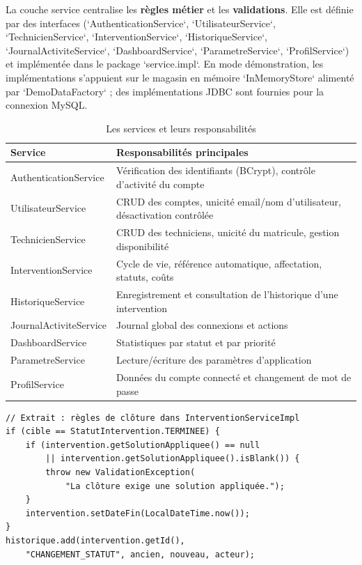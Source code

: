 \documentclass[11pt,a4paper]{report}
\begin{document}
La couche service centralise les \textbf{règles métier} et les \textbf{validations}. Elle est définie par des interfaces (`AuthenticationService`, `UtilisateurService`, `TechnicienService`, `InterventionService`, `HistoriqueService`, `JournalActiviteService`, `DashboardService`, `ParametreService`, `ProfilService`) et implémentée dans le package `service.impl`. En mode démonstration, les implémentations s'appuient sur le magasin en mémoire `InMemoryStore` alimenté par `DemoDataFactory` ; des implémentations JDBC sont fournies pour la connexion MySQL.
\begin{table}[htbp]\centering\small
\begin{tabularx}{\textwidth}{|p{3.8cm}|X|}
\hline\rowcolor{hdr}\textbf{Service} & \textbf{Responsabilités principales}\\ \hline
AuthenticationService & Vérification des identifiants (BCrypt), contrôle d'activité du compte\\ \hline
UtilisateurService & CRUD des comptes, unicité email/nom d'utilisateur, désactivation contrôlée\\ \hline
TechnicienService & CRUD des techniciens, unicité du matricule, gestion disponibilité\\ \hline
InterventionService & Cycle de vie, référence automatique, affectation, statuts, coûts\\ \hline
HistoriqueService & Enregistrement et consultation de l'historique d'une intervention\\ \hline
JournalActiviteService & Journal global des connexions et actions\\ \hline
DashboardService & Statistiques par statut et par priorité\\ \hline
ParametreService & Lecture/écriture des paramètres d'application\\ \hline
ProfilService & Données du compte connecté et changement de mot de passe\\ \hline
\end{tabularx}
\caption{Les services et leurs responsabilités}
\end{table}
\begin{lstlisting}
// Extrait : règles de clôture dans InterventionServiceImpl
if (cible == StatutIntervention.TERMINEE) {
    if (intervention.getSolutionAppliquee() == null
        || intervention.getSolutionAppliquee().isBlank()) {
        throw new ValidationException(
            "La clôture exige une solution appliquée.");
    }
    intervention.setDateFin(LocalDateTime.now());
}
historique.add(intervention.getId(),
    "CHANGEMENT_STATUT", ancien, nouveau, acteur);
\end{lstlisting}
\end{document}
